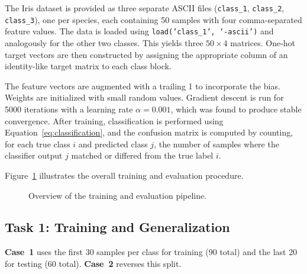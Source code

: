 \documentclass[11pt,a4paper]{article}
\begin{document}
The Iris dataset is provided as three separate ASCII files (\texttt{class\_1}, \texttt{class\_2}, \texttt{class\_3}), one per species, each containing 50 samples with four comma-separated feature values. The data is loaded using \texttt{load('class\_1', '-ascii')} and analogously for the other two classes. This yields three $50 \times 4$ matrices. One-hot target vectors are then constructed by assigning the appropriate column of an identity-like target matrix to each class block.

The feature vectors are augmented with a trailing 1 to incorporate the bias. Weights are initialized with small random values. Gradient descent is run for 5000 iterations with a learning rate $\alpha = 0.001$, which was found to produce stable convergence. After training, classification is performed using Equation~\eqref{eq:classification}, and the confusion matrix is computed by counting, for each true class $i$ and predicted class $j$, the number of samples where the classifier output $j$ matched or differed from the true label $i$.

Figure~\ref{fig:flowchart} illustrates the overall training and evaluation procedure.

\begin{figure}[ht]
\centering
{}
\caption{Overview of the training and evaluation pipeline.}
\label{fig:flowchart}
\end{figure}

\subsection{Task 1: Training and Generalization}

\textbf{Case~1} uses the first 30 samples per class for training (90 total) and the last 20 for testing (60 total). \textbf{Case~2} reverses this split.

\end{document}

